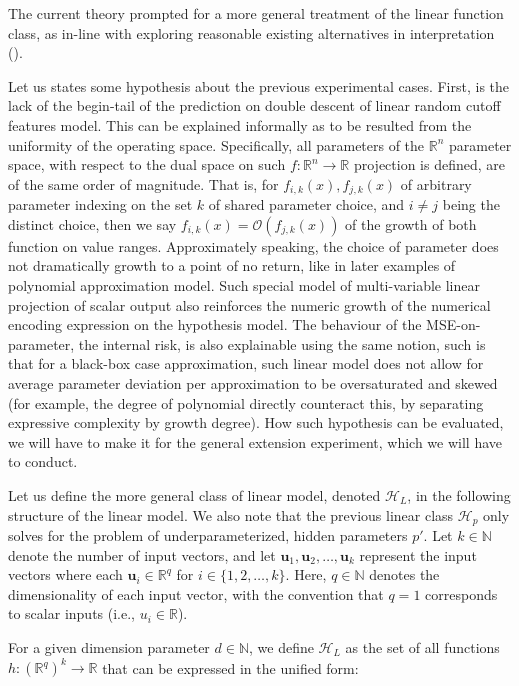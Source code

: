\documentclass[10pt]{article} %
\begin{document}
The current theory prompted for a more general treatment of the linear function class, as in-line with exploring reasonable existing alternatives in interpretation (\cite{nakkiran2019datahurtlinearregression}).

Let us states some hypothesis about the previous experimental cases. First, is the lack of the begin-tail of the prediction on double descent of linear random cutoff features model. This can be explained informally as to be resulted from the uniformity of the operating space. Specifically, all parameters of the $\mathbb{R}^{n}$ parameter space, with respect to the dual space on such $f:\mathbb{R}^{n}\to\mathbb{R}$ projection is defined, are of the same order of magnitude. That is, for $f_{i,k}(x),f_{j,k}(x)$ of arbitrary parameter indexing on the set $k$ of shared parameter choice, and $i\neq j$ being the distinct choice, then we say $f_{i,k}(x)=\mathcal{O}(f_{j,k}(x))$ of the growth of both function on value ranges. Approximately speaking, the choice of parameter does not dramatically growth to a point of no return, like in later examples of polynomial approximation model. Such special model of multi-variable linear projection of scalar output also reinforces the numeric growth of the numerical encoding expression on the hypothesis model. The behaviour of the MSE-on-parameter, the internal risk, is also explainable using the same notion, such is that for a black-box case approximation, such linear model does not allow for average parameter deviation per approximation to be oversaturated and skewed (for example, the degree of polynomial directly counteract this, by separating expressive complexity by growth degree). How such hypothesis can be evaluated, we will have to make it for the general extension experiment, which we will have to conduct. 

Let us define the more general class of linear model, denoted $\mathcal{H}_{L}$, in the following structure of the linear model. We also note that the previous linear class $\mathcal{H}_{p}$ only solves for the problem of underparameterized, hidden parameters $p'$. Let $k \in \mathbb{N}$ denote the number of input vectors, and let $\mathbf{u}_1, \mathbf{u}_2, \ldots, \mathbf{u}_k$ represent the input vectors where each $\mathbf{u}_i \in \mathbb{R}^{q}$ for $i \in \{1, 2, \ldots, k\}$. Here, $q \in \mathbb{N}$ denotes the dimensionality of each input vector, with the convention that $q = 1$ corresponds to scalar inputs (i.e., $u_i \in \mathbb{R}$).

For a given dimension parameter $d \in \mathbb{N}$, we define $\mathcal{H}_{L}$ as the set of all functions $h: (\mathbb{R}^{q})^k \to \mathbb{R}$ that can be expressed in the unified form:
\end{document}
